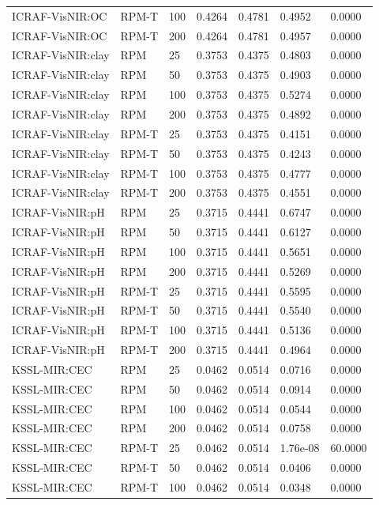 \begin{tabular}{lllllll}
ICRAF-VisNIR:OC & RPM-T & 100 & 0.4264 & 0.4781 & 0.4952 & 0.0000 \\
ICRAF-VisNIR:OC & RPM-T & 200 & 0.4264 & 0.4781 & 0.4957 & 0.0000 \\
ICRAF-VisNIR:clay & RPM & 25 & 0.3753 & 0.4375 & 0.4803 & 0.0000 \\
ICRAF-VisNIR:clay & RPM & 50 & 0.3753 & 0.4375 & 0.4903 & 0.0000 \\
ICRAF-VisNIR:clay & RPM & 100 & 0.3753 & 0.4375 & 0.5274 & 0.0000 \\
ICRAF-VisNIR:clay & RPM & 200 & 0.3753 & 0.4375 & 0.4892 & 0.0000 \\
ICRAF-VisNIR:clay & RPM-T & 25 & 0.3753 & 0.4375 & 0.4151 & 0.0000 \\
ICRAF-VisNIR:clay & RPM-T & 50 & 0.3753 & 0.4375 & 0.4243 & 0.0000 \\
ICRAF-VisNIR:clay & RPM-T & 100 & 0.3753 & 0.4375 & 0.4777 & 0.0000 \\
ICRAF-VisNIR:clay & RPM-T & 200 & 0.3753 & 0.4375 & 0.4551 & 0.0000 \\
ICRAF-VisNIR:pH & RPM & 25 & 0.3715 & 0.4441 & 0.6747 & 0.0000 \\
ICRAF-VisNIR:pH & RPM & 50 & 0.3715 & 0.4441 & 0.6127 & 0.0000 \\
ICRAF-VisNIR:pH & RPM & 100 & 0.3715 & 0.4441 & 0.5651 & 0.0000 \\
ICRAF-VisNIR:pH & RPM & 200 & 0.3715 & 0.4441 & 0.5269 & 0.0000 \\
ICRAF-VisNIR:pH & RPM-T & 25 & 0.3715 & 0.4441 & 0.5595 & 0.0000 \\
ICRAF-VisNIR:pH & RPM-T & 50 & 0.3715 & 0.4441 & 0.5540 & 0.0000 \\
ICRAF-VisNIR:pH & RPM-T & 100 & 0.3715 & 0.4441 & 0.5136 & 0.0000 \\
ICRAF-VisNIR:pH & RPM-T & 200 & 0.3715 & 0.4441 & 0.4964 & 0.0000 \\
KSSL-MIR:CEC & RPM & 25 & 0.0462 & 0.0514 & 0.0716 & 0.0000 \\
KSSL-MIR:CEC & RPM & 50 & 0.0462 & 0.0514 & 0.0914 & 0.0000 \\
KSSL-MIR:CEC & RPM & 100 & 0.0462 & 0.0514 & 0.0544 & 0.0000 \\
KSSL-MIR:CEC & RPM & 200 & 0.0462 & 0.0514 & 0.0758 & 0.0000 \\
KSSL-MIR:CEC & RPM-T & 25 & 0.0462 & 0.0514 & 1.76e-08 & 60.0000 \\
KSSL-MIR:CEC & RPM-T & 50 & 0.0462 & 0.0514 & 0.0406 & 0.0000 \\
KSSL-MIR:CEC & RPM-T & 100 & 0.0462 & 0.0514 & 0.0348 & 0.0000 \\

\end{tabular}
